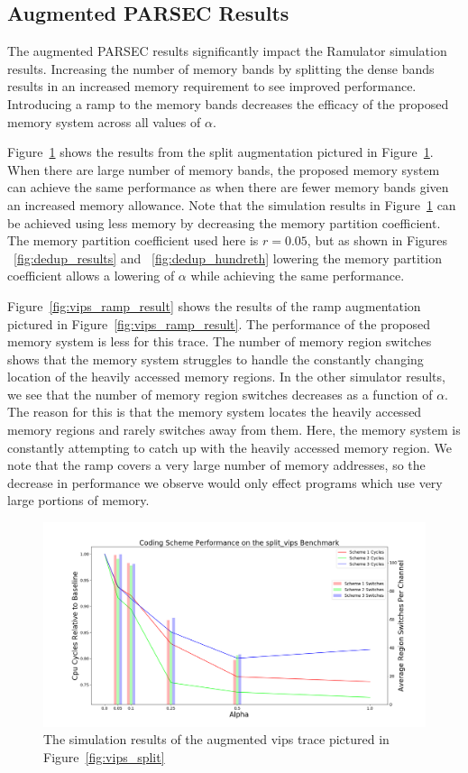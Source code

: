 \subsection{Augmented PARSEC Results}

The augmented PARSEC results significantly impact the Ramulator simulation results. Increasing the number of memory bands by splitting the dense bands results in an increased memory requirement to see improved performance. Introducing a ramp to the memory bands decreases the efficacy of the proposed memory system across all values of $\alpha$.

Figure~\ref{fig:vips_split_result} shows the results from the split augmentation pictured in Figure~\ref{fig:vips_split_result}. When there are large number of memory bands, the proposed memory system can achieve the same performance as when there are fewer memory bands given an increased memory allowance. Note that the simulation results in Figure~\ref{fig:vips_split_result} can be achieved using less memory by decreasing the memory partition coefficient. The memory partition coefficient used here is $r = 0.05$, but as shown in Figures ~\ref{fig:dedup_results} and ~\ref{fig:dedup_hundreth} lowering the memory partition coefficient allows a lowering of $\alpha$ while achieving the same performance.

Figure~\ref{fig:vips_ramp_result} shows the results of the ramp augmentation pictured in Figure~\ref{fig:vips_ramp_result}. The performance of the proposed memory system is less for this trace. The number of memory region switches shows that the memory system struggles to handle the constantly changing location of the heavily accessed memory regions. In the other simulator results, we see that the number of memory region switches decreases as a function of $\alpha$. The reason for this is that the memory system locates the heavily accessed memory regions and rarely switches away from them. Here, the memory system is constantly attempting to catch up with the heavily accessed memory region. {\color{blue}We note that the ramp covers a very large number of memory addresses, so the decrease in performance we observe would only effect programs which use very large portions of memory.} 

\begin{figure}[htbp]
		\includegraphics[width=\linewidth]{fig/vips_split_results.png}
		\caption{The simulation results of the augmented vips trace pictured in Figure~\ref{fig:vips_split}}
		\label{fig:vips_split_result}
\end{figure}


